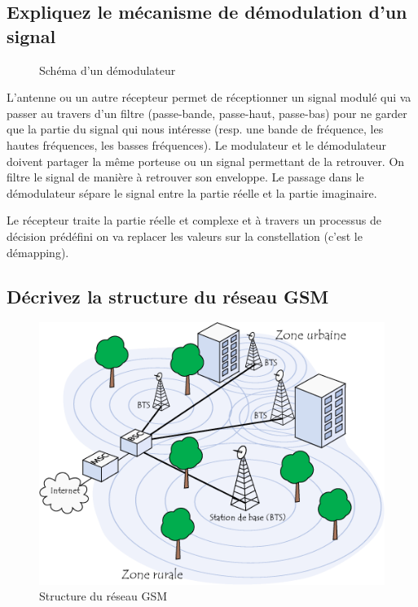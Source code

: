 \subsection{Expliquez le mécanisme de démodulation d'un signal}

\begin{figure}[H]

\caption{Schéma d'un démodulateur}
\end{figure}

L'antenne ou un autre récepteur permet de réceptionner un signal modulé qui va passer au travers d'un filtre (passe-bande, passe-haut, passe-bas) pour ne garder que la partie du signal qui nous intéresse (resp. une bande de fréquence, les hautes fréquences, les basses fréquences). Le modulateur et le démodulateur doivent partager la même porteuse ou un signal permettant de la retrouver. On filtre le signal de manière à retrouver
son enveloppe. Le passage dans le démodulateur sépare le signal entre la partie réelle et la partie imaginaire.

Le récepteur traite la partie réelle et complexe et à travers un processus de décision prédéfini on va replacer les valeurs sur la constellation (c'est le démapping).

\subsection{Décrivez la structure du réseau GSM}

\begin{figure}[H]
    \centering
    \includegraphics[width=\linewidth]{img/structure_reseau_gsm.png}
    \caption{Structure du réseau GSM}
\end{figure}

